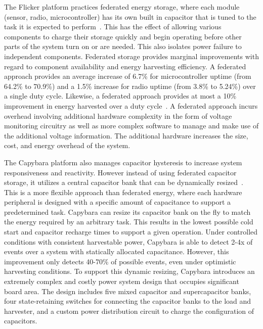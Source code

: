 The Flicker
platform practices federated energy storage, where each module (sensor, radio, microcontroller) has its own built in capacitor that is tuned to the task it is expected to perform~\cite{hesterFlicker17, hesterTragedy15}.
This has the
effect of allowing various components to charge their storage quickly and begin operating before other parts of the system turn on or are needed. This also
isolates power failure to independent components.
Federated storage provides marginal improvements with regard to component availability and energy harvesting efficiency. A federated approach provides an average increase of 6.7\% for microcontroller uptime (from 64.2\% to 70.9\%) and a 1.5\% increase for radio uptime (from 3.8\% to 5.24\%) over a single duty cycle. Likewise, a federated approach provides at most a 10\% improvement in energy harvested over a duty cycle~\cite{hesterTragedy15}.
A federated approach incurs overhead involving additional hardware complexity in the form of voltage monitoring circuitry as well as more complex software to manage and make use of the additional voltage information. The additional hardware increases the size, cost, and energy overhead of the system.

The Capybara platform also manages capacitor hysteresis to increase system responsiveness and reactivity. However instead of using federated capacitor storage, it utilizes a central capacitor bank that can be dynamically resized~\cite{colinReconfigurable18}.
This is a more flexible approach than federated energy, where each hardware peripheral is designed with a specific amount of capacitance to support a predetermined task.
Capybara can resize its capacitor bank on the fly to match the energy required by an arbitrary task. This results in the lowest possible cold start and capacitor recharge times to support a given operation.
Under controlled conditions with consistent harvestable power, Capybara is able to detect 2-4x of events over a system with statically allocated capacitance. However, this improvement only detects 40-70\% of possible events, even under optimistic harvesting conditions.
To support this dynamic resizing, Capybara introduces an extremely complex and costly power system design that occupies significant board area.
The design includes five mixed capacitor and supercapacitor banks, four state-retaining switches for connecting the capacitor banks to the load and harvester, and a custom power distribution circuit to charge the configuration of capacitors.

